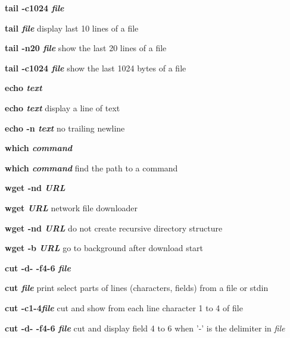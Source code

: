\documentclass[a4paper,11pt,twoside]{article}
\begin{document}
\vspace{1mm}

\begin{labeling}{\textbf{tail -c1024 \textit{file}}}
\item [\textbf{tail \textit{file}}] display last 10 lines of a file
\item [\textbf{tail -n20 \textit{file}}] show the last 20 lines of a file
\item [\textbf{tail -c1024 \textit{file}}] show the last 1024 bytes of a file
\end{labeling}

\vspace{1mm}

\begin{labeling}{\textbf{echo \textit{text}}}
\item [\textbf{echo \textit{text}}] display a line of text
\item [\textbf{echo -n \textit{text}}] no trailing newline
\end{labeling}

\vspace{1mm}

\begin{labeling}{\textbf{which \textit{command}}}
\item [\textbf{which \textit{command}}] find the path to a command
\end{labeling}

\vspace{1mm}

\begin{labeling}{\textbf{wget -nd \textit{URL}}}
\item [\textbf{wget \textit{URL}}] network file downloader
\item [\textbf{wget -nd \textit{URL}}] do not create recursive directory structure
\item [\textbf{wget -b \textit{URL}}] go to background after download start 
\end{labeling}

\vspace{1mm}

\begin{labeling}{\textbf{cut -d- -f4-6 \textit{file}}}
\item [\textbf{cut \textit{file}}] print select parts of lines (characters, fields) from a file or stdin
\item [\textbf{cut -c1-4\textit{file}}] cut and show from each line character 1 to 4 of file
\item [\textbf{cut -d- -f4-6 \textit{file}}] cut and display field 4 to 6 when '-' is the delimiter in \textit{file}
\end{labeling}
\end{document}
